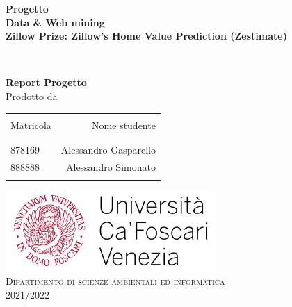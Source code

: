 \begin{titlepage}

\begin{center}

\textup{\small {\bf Progetto \\ Data \& Web mining} }\\[0.2in]

\Large \textbf {Zillow Prize: Zillow’s Home Value Prediction (Zestimate)}\\[0.5in]

\end{center}
~
\begin{center}

\textup{\small {\bf Report Progetto}}\\[0.2in]
              
\normalsize Prodotto da \\
\begin{table}[h]
\centering
\begin{tabular}{lr}\hline \\
Matricola & Nome studente \\ \\ \hline
\\
878169 & Alessandro Gasparello \\
888888 & Alessandro Simonato \\ \\ \hline 
\end{tabular}
\end{table}
              
\vspace{1.9in}
            
\includegraphics[width=0.60\textwidth]{./unive.png}\\[0.3in]
\normalsize
\textsc{Dipartimento di scienze ambientali ed informatica}\\
\vspace{0.2cm}
       2021/2022
              
\end{center}
              
\end{titlepage}
              
